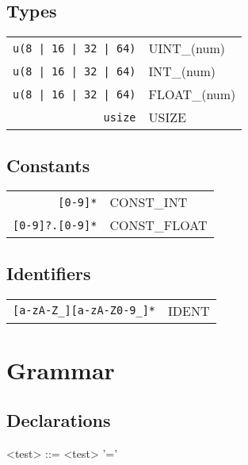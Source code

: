 \documentclass{article}
\begin{document}
		\subsection{Types}	
			\begin{tabular}{rl}
				\texttt{u(8 | 16 | 32 | 64)} & UINT\_(num)\\
				\texttt{u(8 | 16 | 32 | 64)} & INT\_(num)\\
				\texttt{u(8 | 16 | 32 | 64)}  & FLOAT\_(num)\\
				\texttt{usize} & USIZE\\ 
			\end{tabular}
		\subsection{Constants}
			\begin{tabular}{rl}
				\texttt{[0-9]*} & CONST\_INT\\
				\texttt{[0-9]?.[0-9]*} & CONST\_FLOAT\\
			\end{tabular}
		\subsection{Identifiers}
			\begin{tabular}{rl}
				\texttt{[a-zA-Z\_][a-zA-Z0-9\_]*} & IDENT\\
			\end{tabular}	
	\section{Grammar}
		\subsection{Declarations}
			\begin{grammar}
				<test> ::= <test> '=' 
			\end{grammar}
			
\end{document}
